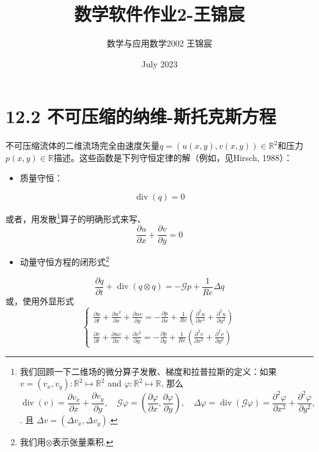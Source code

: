 \documentclass[UTF8]{ctexart}
\title{数学软件作业2-王锦宸}
\author{数学与应用数学2002 王锦宸}
\date{July 2023}
\begin{document}
\maketitle

\section*{12.2 不可压缩的纳维-斯托克斯方程}
不可压缩流体的二维流场完全由速度矢量$q=(u(x,y),v(x,y))\in \mathbb{R}^2$和压力$p(x,y)\in \mathbb{R}$描述。这些函数是下列守恒定律的解（例如，见Hirsch, 1988）：
\begin{itemize}
    \item 质量守恒：
\end{itemize}
\begin{equation}
    \operatorname{div}(q)=0\label{12.1}
\end{equation}

\indent 或者，用发散\footnote{我们回顾一下二维场的微分算子发散、梯度和拉普拉斯的定义：如果 $v=\left(v_x, v_y\right): \mathbb{R}^2 \mapsto \mathbb{R}^2$ and $\varphi: \mathbb{R}^2 \mapsto \mathbb{R}$, 那么$$
\operatorname{div}(v)=\frac{\partial v_x}{\partial x}+\frac{\partial v_y}{\partial y}, \quad \mathcal{G} \varphi=\left(\frac{\partial \varphi}{\partial x}, \frac{\partial \varphi}{\partial y}\right), \quad \Delta \varphi=\operatorname{div}(\mathcal{G} \varphi)=\frac{\partial^2 \varphi}{\partial x^2}+\frac{\partial^2 \varphi}{\partial y^2},
$$.
且 $\Delta v=\left(\Delta v_x, \Delta v_y\right)$.}算子的明确形式来写、
\begin{equation}
    \frac{\partial u}{\partial x}+\frac{\partial v}{\partial y}=0\label{12.2}
\end{equation}

\begin{itemize}
    \item 动量守恒方程的闭形式\footnote{我们用$\otimes$表示张量乘积.}
\end{itemize}
\begin{equation}
    \frac{\partial q}{\partial t}+\operatorname{div}(q \otimes q)=-\mathcal{G} p+\frac{1}{R e} \Delta q
    \label{12.3}
\end{equation}
\indent 或，使用外显形式
\begin{equation}
    \left\{\begin{array}{l}
\frac{\partial u}{\partial t}+\frac{\partial u^2}{\partial x}+\frac{\partial u v}{\partial y}=-\frac{\partial p}{\partial x}+\frac{1}{R e}\left(\frac{\partial^2 u}{\partial x^2}+\frac{\partial^2 u}{\partial y^2}\right) \\
\frac{\partial v}{\partial t}+\frac{\partial u v}{\partial x}+\frac{\partial v^2}{\partial y}=-\frac{\partial p}{\partial y}+\frac{1}{R e}\left(\frac{\partial^2 v}{\partial x^2}+\frac{\partial^2 v}{\partial y^2}\right)
\end{array}\right.
\label{12.4}
\end{equation}
\end{document}
